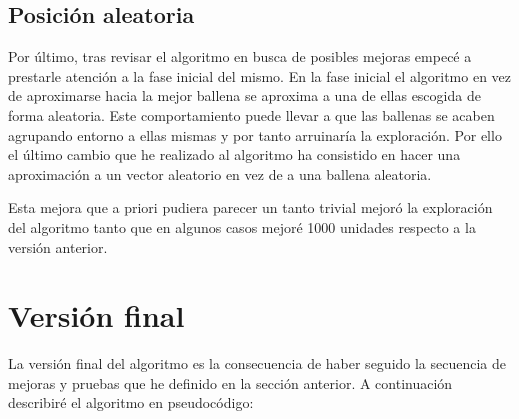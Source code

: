 \documentclass[12pt,a4paper]{article}
\begin{document}
    \subsection{Posición aleatoria}
    
    Por último, tras revisar el algoritmo en busca de posibles mejoras empecé a prestarle atención a la fase inicial del mismo. En la fase inicial el algoritmo en vez de aproximarse hacia la mejor ballena se aproxima a una de ellas escogida de forma aleatoria. Este comportamiento puede llevar a que las ballenas se acaben agrupando entorno a ellas mismas y por tanto arruinaría la exploración. Por ello el último cambio que he realizado al algoritmo ha consistido en hacer una aproximación a un vector aleatorio en vez de a una ballena aleatoria.
    
    Esta mejora que a priori pudiera parecer un tanto trivial mejoró la exploración del algoritmo tanto que en algunos casos mejoré 1000 unidades respecto a la versión anterior.
    
	
	\section{Versión final}
	\label{sec:versionFinal}
	
	La versión final del algoritmo es la consecuencia de haber seguido la secuencia de mejoras y pruebas que he definido en la sección anterior. A continuación describiré el algoritmo en pseudocódigo:
	
\end{document}

